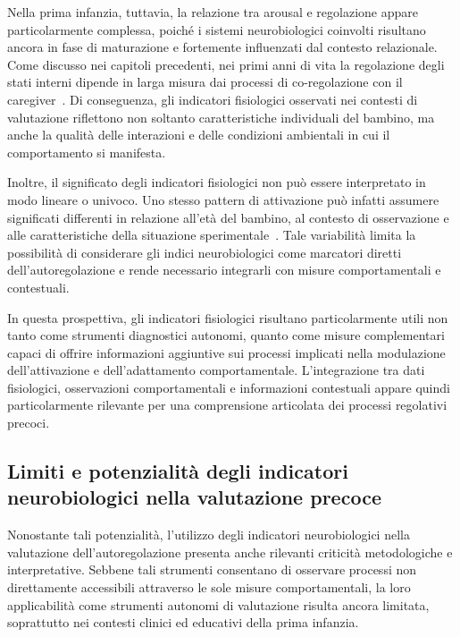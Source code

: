             Nella prima infanzia, tuttavia, la relazione tra arousal e regolazione appare particolarmente complessa, poiché i sistemi neurobiologici coinvolti risultano ancora in fase di maturazione e fortemente influenzati dal contesto relazionale. Come discusso nei capitoli precedenti, nei primi anni di vita la regolazione degli stati interni dipende in larga misura dai processi di co-regolazione con il caregiver~\cite{calkins2007hill}. Di conseguenza, gli indicatori fisiologici osservati nei contesti di valutazione riflettono non soltanto caratteristiche individuali del bambino, ma anche la qualità delle interazioni e delle condizioni ambientali in cui il comportamento si manifesta.

            Inoltre, il significato degli indicatori fisiologici non può essere interpretato in modo lineare o univoco. Uno stesso pattern di attivazione può infatti assumere significati differenti in relazione all'età del bambino, al contesto di osservazione e alle caratteristiche della situazione sperimentale~\cite{cole2004,doebel2020}. Tale variabilità limita la possibilità di considerare gli indici neurobiologici come marcatori diretti dell'autoregolazione e rende necessario integrarli con misure comportamentali e contestuali.

            In questa prospettiva, gli indicatori fisiologici risultano particolarmente utili non tanto come strumenti diagnostici autonomi, quanto come misure complementari capaci di offrire informazioni aggiuntive sui processi implicati nella modulazione dell'attivazione e dell'adattamento comportamentale. L'integrazione tra dati fisiologici, osservazioni comportamentali e informazioni contestuali appare quindi particolarmente rilevante per una comprensione articolata dei processi regolativi precoci.

        \subsection{Limiti e potenzialità degli indicatori neurobiologici nella valutazione precoce}
        \label{sec:3_3_4}

            Nonostante tali potenzialità, l'utilizzo degli indicatori neurobiologici nella valutazione dell'autoregolazione presenta anche rilevanti criticità metodologiche e interpretative. Sebbene tali strumenti consentano di osservare processi non direttamente accessibili attraverso le sole misure comportamentali, la loro applicabilità come strumenti autonomi di valutazione risulta ancora limitata, soprattutto nei contesti clinici ed educativi della prima infanzia.

